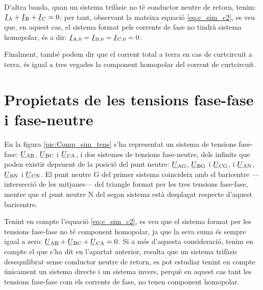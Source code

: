 D'altra banda, quan un sistema trifàsic no té conductor neutre de retorn, tenim:
$\cmplx{I}\ped{A}+ \cmplx{I}\ped{B}+\cmplx{I}\ped{C}=0$; per tant,
observant la mateixa equació \eqref{eq:c_sim_c2}, es veu que, en aquest cas,  el
sistema format pels corrents de fase no tindrà sistema homopolar, és a dir: $\cmplx{I}\ped{A,0}=\cmplx{I}\ped{B,0}=\cmplx{I}\ped{C,0}=0$.

Finalment, també podem dir que el corrent total a terra en cas de
curtcircuit a terra, és igual a tres vegades la component homopolar del
corrent de curtcircuit.

\section{Propietats de les tensions fase-fase i fase-neutre}\label{sec:comp-sim-neutre}
 

En la figura \vref{pic:Comp_sim_tens} s'ha representat un sistema de
tensions fase-fase: $\cmplx{U}\ped{AB}$,
$\cmplx{U}\ped{BC}$ i $\cmplx{U}\ped{CA}$, i dos
sistemes de tensions fase-neutre, dels infinits que poden existir
depenent de la posició del punt neutre: $\cmplx{U}\ped{AG}$,
$\cmplx{U}\ped{BG}$ i $\cmplx{U}\ped{CG}$, i
$\cmplx{U}\ped{AN}$, $\cmplx{U}\ped{BN}$ i
$\cmplx{U}\ped{CN}$. El punt neutre G del primer sistema
coincideix amb el baricentre ---intersecció de les mitjanes--- del
triangle  format per les tres tensions fase-fase, mentre que el
punt neutre N del segon sistema està desplaçat respecte
d'aquest baricentre.

\begin{center}
    
    \label{pic:Comp_sim_tens}
\end{center}

Tenint en compte l'equació \eqref{eq:c_sim_c2}, es veu que el sistema
format per les tensions fase-fase no té component homopolar, ja que
la seva suma  és sempre igual a zero: $\cmplx{U}\ped{AB} +
\cmplx{U}\ped{BC} + \cmplx{U}\ped{CA} = 0$. Si a més
d'aquesta consideració, tenim en compte el que s'ha dit en l'apartat
anterior, resulta que un sistema trifàsic desequilibrat sense conductor
neutre de retorn, es pot estudiar tenint en compte únicament un sistema directe
i un sistema invers, perquè en aquest cas tant les tensions fase-fase com els
corrents de fase, no tenen component homopolar.

